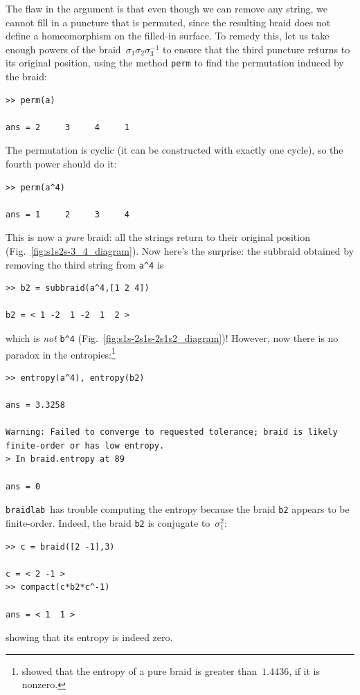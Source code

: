 \documentclass[12pt]{article}
\newcommand{\braidlab}{\texttt{braidlab}}%
\begin{document}
The flaw in the argument is that even though we can remove any string, we
cannot fill in a puncture that is permuted, since the resulting braid does not
define a homeomorphism on the filled-in surface.  To remedy this, let us take
enough powers of the braid~$\sigma_1\sigma_2\sigma_3^{-1}$ to ensure that the
third puncture returns to its original position, using the method
\texttt{perm} to find the permutation induced by the braid:
\begin{lstlisting}[frame=single,framerule=0pt]
>> perm(a)

ans = 2     3     4     1
\end{lstlisting}
The permutation is cyclic (it can be constructed with exactly one cycle), so
the fourth power should do it:
\begin{lstlisting}[frame=single,framerule=0pt]
>> perm(a^4)

ans = 1     2     3     4
\end{lstlisting}
This is now a \emph{pure} braid: all the strings return to their original
position (Fig.~\ref{fig:s1s2s-3_4_diagram}).  Now here's the surprise: the
subbraid obtained by removing the third string from \texttt{a\^{}4} is
\begin{lstlisting}[frame=single,framerule=0pt]
>> b2 = subbraid(a^4,[1 2 4])

b2 = < 1 -2  1 -2  1  2 >
\end{lstlisting}
which is \emph{not} \texttt{b\^{}4} (Fig.~\ref{fig:s1s-2s1s-2s1s2_diagram})!
However, now there is no paradox in the entropies:\footnote{\citet{Song2005}
  showed that the entropy of a pure braid is greater than~$1.4436$, if it is
  nonzero.}
\begin{lstlisting}[frame=single,framerule=0pt]
>> entropy(a^4), entropy(b2)

ans = 3.3258

Warning: Failed to converge to requested tolerance; braid is likely finite-order or has low entropy.
> In braid.entropy at 89

ans = 0
\end{lstlisting}
\braidlab\ has trouble computing the entropy because the braid \texttt{b2}
appears to be finite-order.  Indeed, the braid \texttt{b2} is conjugate
to~$\sigma_1^2$:
\begin{lstlisting}[frame=single,framerule=0pt]
>> c = braid([2 -1],3)

c = < 2 -1 >
>> compact(c*b2*c^-1)

ans = < 1  1 >
\end{lstlisting}
showing that its entropy is indeed zero.
\end{document}
